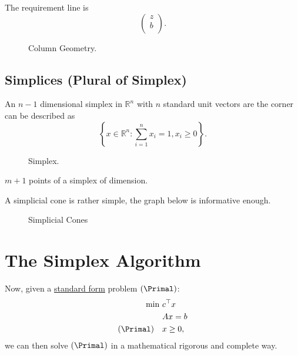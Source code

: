 The requirement line is
\[
	\begin{pmatrix}
		z \\
		b \\
	\end{pmatrix}.
\]

\begin{figure}[H]
	\centering
	\caption{Column Geometry.}
	\label{fig:column-geometry}
\end{figure}

\subsection{Simplices (Plural of Simplex)}
\begin{eg}[Simplex]
	An \(n-1\) dimensional simplex in \(\mathbb{R}^n\) with \(n\) standard unit vectors are the corner can be described as
	\[
		\left\{x\in \mathbb{R}^n \colon \sum\limits_{i=1}^{n} x_i = 1, x_i \geq 0\right\}.
	\]
	\begin{figure}[H]
		\centering
		\caption{Simplex.}
		\label{fig:simplex}
	\end{figure}
\end{eg}

\begin{note}
	\(m+1\) points of a simplex of dimension.
\end{note}

A simplicial cone is rather simple, the graph below is informative enough.
\begin{figure}[H]
	\centering
	\caption{Simplicial Cones}
	\label{fig:simplicial-cones}
\end{figure}

\section{The Simplex Algorithm}
Now, given a \hyperref[def:standard-form]{standard form} problem \((\Primal)\):
\[
	\begin{aligned}
		\min~          & c^{\top}x \\
		               & Ax = b    \\
		(\Primal)\quad & x\geq 0,
	\end{aligned}
\]
we can then solve \((\Primal)\) in a mathematical rigorous and complete way.

